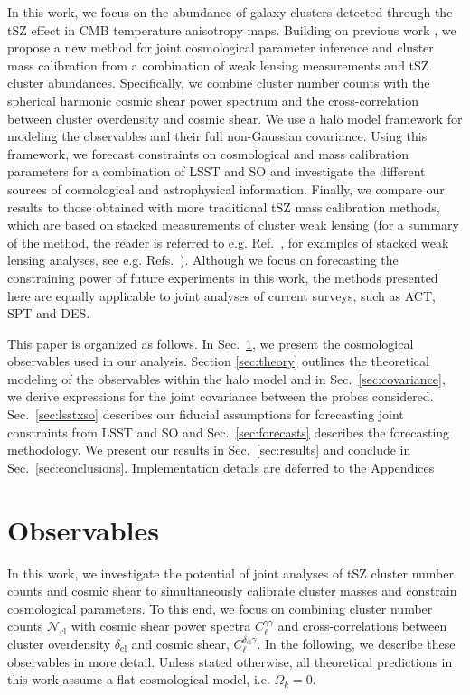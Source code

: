\documentclass[%
 reprint,
nofootinbib,
 amsmath,amssymb,
 aps,
]{revtex4-1}
\begin{document}
In this work, we focus on the abundance of galaxy clusters detected through the tSZ effect in CMB temperature anisotropy maps. Building on previous work \cite{Oguri:2011, Shirasaki:2015, Krause:2017}, we propose a new method for joint cosmological parameter inference and cluster mass calibration from a combination of weak lensing measurements and tSZ cluster abundances. Specifically, we combine cluster number counts with the spherical harmonic cosmic shear power spectrum and the cross-correlation between cluster overdensity and cosmic shear. We use a halo model  \cite{Ma:2000, Peacock:2000, Seljak:2000, Cooray:2002} framework for modeling the observables and their full non-Gaussian covariance. Using this framework, we forecast constraints on cosmological and mass calibration parameters for a combination of LSST and SO and investigate the different sources of cosmological and astrophysical information. Finally, we compare our results to those obtained with more traditional tSZ mass calibration methods, which are based on stacked measurements of cluster weak lensing (for a summary of the method, the reader is referred to e.g. Ref.~\cite{Madhavacheril:2017}, for examples of stacked weak lensing analyses, see e.g. Refs.~\cite{Medezinski:2018, Miyatake:2019}). Although we focus on forecasting the constraining power of future experiments in this work, the methods presented here are equally applicable to joint analyses of current surveys, such as ACT, SPT and DES.

This paper is organized as follows. In Sec.~\ref{sec:obs}, we present the cosmological observables used in our analysis. Section \ref{sec:theory} outlines the theoretical modeling of the observables within the halo model and in Sec.~\ref{sec:covariance}, we derive expressions for the joint covariance between the probes considered. Sec.~\ref{sec:lsstxso} describes our fiducial assumptions for forecasting joint constraints from LSST and SO and Sec.~\ref{sec:forecasts} describes the forecasting methodology. We present our results in Sec.~\ref{sec:results} and conclude in Sec.~\ref{sec:conclusions}. Implementation details are deferred to the Appendices 

\section{Observables}\label{sec:obs}

In this work, we investigate the potential of joint analyses of tSZ cluster number counts and cosmic shear to simultaneously calibrate cluster masses and constrain cosmological parameters. To this end, we focus on combining cluster number counts $\mathcal{N}_{\mathrm{cl}}$ with cosmic shear power spectra $C_{\ell}^{\gamma \gamma}$ and cross-correlations between cluster overdensity $\delta_{\mathrm{cl}}$ and cosmic shear, $C_{\ell}^{\delta_{\mathrm{cl}} \gamma}$. In the following, we describe these observables in more detail. Unless stated otherwise, all theoretical predictions in this work assume a flat cosmological model, i.e. $\Omega_{k} = 0$.
\end{document}
